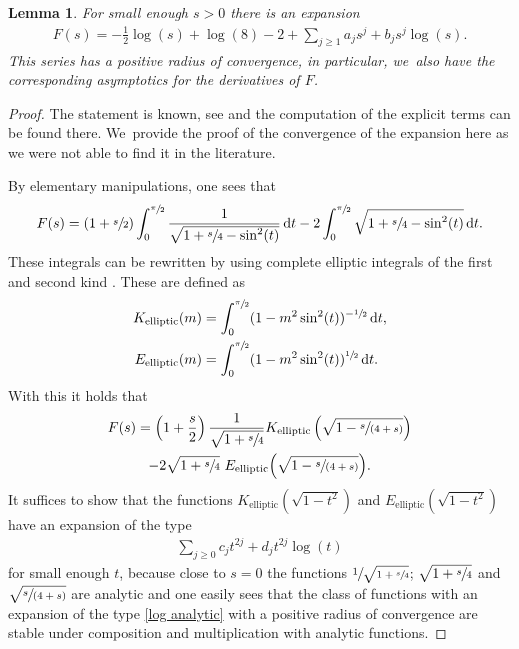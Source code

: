 \documentclass[10pt]{amsart}
\newcommand{\spfrac}[2]{\sfrac{#1}{(#2)}}
\newtheorem{lemma}[theorem]{Lemma}
\theoremstyle{definition}
\newcommand\eq{=}
\newcommand\dd{\,\mathrm{d}}
\newcommand\dt{\dd t}
\begin{document}
\begin{lemma}\label{Series F}
For small enough $s>0$ there is an expansion
\begin{align}
F(s)=-\frac{1}{2}\log(s)+\log(8)-2+\sum_{j\geq 1} a_js^j+b_js^j\log(s).\label{exp F}
\end{align}
This series has a positive radius of convergence, in particular, we~also have the corresponding asymptotics for the derivatives of $F$.
\end{lemma}
\begin{proof}
The statement is known, see \eg \cite[Footnote 101]{Sverak} and the computation of the explicit terms can be found there. We~provide the proof of the convergence of the expansion here as we were not able to find it in the literature.

By elementary manipulations, one sees that
\begin{align*}
F(s)\eq(1+\sfrac{s}{2})\int_0^{\sfrac{\pi}{2}}\frac{1}{\sqrt{1+\sfrac{s}{4}-\sin^2(t)}}\dt-2\int_0^{\sfrac{\pi}{2}}\sqrt{1+\sfrac{s}{4}-\sin^2(t)}\dt.
\end{align*}
These integrals can be rewritten by using complete elliptic integrals of the first and second kind \cite{byrd2013handbook}. These are defined as
\begin{align*}
K_\mathrm{elliptic}(m)&=\int_0^{\sfrac{\pi}{2}}(1-m^2\sin^2(t))^{-\sfrac{1}{2}}\dt,\\
E_\mathrm{elliptic}(m)&=\int_0^{\sfrac{\pi}{2}}(1-m^2\sin^2(t))^{\sfrac{1}{2}}\dt.
\end{align*}
With this it holds that
\begin{multline*}
F(s)\eq\left(1+\frac{s}{2}\right)\frac{1}{\sqrt{1+\sfrac{s}{4}}}K_\mathrm{elliptic}\left(\sqrt{1-\spfrac{s}{4+s}}\right)\\
-2\sqrt{1+\sfrac{s}{4}}\,\,E_\mathrm{elliptic}\Bigl(\sqrt{1-\spfrac{s}{4+s}}\Bigr).
\end{multline*}
It suffices to show that the functions $K_\mathrm{elliptic}(\sqrt{1-t^2})$ and $E_\mathrm{elliptic}(\sqrt{1-t^2})$ have an expansion of the type
\begin{align}
\sum_{j\geq 0}c_jt^{2j}+d_jt^{2j}\log (t)\label{log analytic}
\end{align}
for small enough $t$, because close to $s=0$ the functions $\sfrac{1}{\sqrt{1+\sfrac{s}{4}}}$; $\sqrt{1+\sfrac{s}{4}}$ and $\sqrt{\spfrac{s}{4+s}}$ are analytic and one easily sees that the class of functions with an expansion of the type \eqref{log analytic} with a positive radius of convergence are stable under composition and multiplication with analytic functions.


\end{proof}
\end{document}
